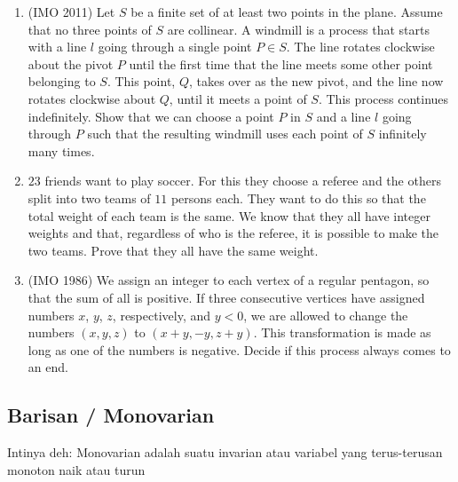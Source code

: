 \documentclass[12pt]{scrartcl}
\begin{document}
\begin{enumerate}
    \item (IMO 2011) Let $S$ be a finite set of at least two points in the plane. Assume that no three points of $S$ are collinear. A windmill is a process that starts with a line $l$ going through a single point $P \in S$. The line rotates clockwise about the pivot $P$ until the first time that the line meets some other point belonging to $S$. This point, $Q$, takes over as the new pivot, and the line now rotates clockwise about $Q$, until it meets a point of $S$. This process continues indefinitely. Show that we can choose a point $P$ in $S$ and a line $l$ going through $P$ such that the resulting windmill uses each point of $S$ infinitely many times.

    \item $23$ friends want to play soccer. For this they choose a referee and the others split into two teams of $11$ persons each. They want to do this so that the total weight of each team is the same. We know that they all have integer weights and that, regardless of who is the referee, it is possible to make the two teams. Prove that they all have the same weight.

    \item (IMO 1986) We assign an integer to each vertex of a regular pentagon, so that the sum of all is positive. If three consecutive vertices have assigned numbers $x$, $y$, $z$, respectively, and $y < 0$, we are allowed to change the numbers $(x,y,z)$ to $(x + y,-y,z + y)$. This transformation is made as long as one of the numbers is negative. Decide if this process always comes to an end.
\end{enumerate}

\subsection{Barisan / Monovarian}
\begin{definition}
    Intinya deh: Monovarian adalah suatu invarian atau variabel yang terus-terusan monoton naik atau turun
\end{definition}
\end{document}
